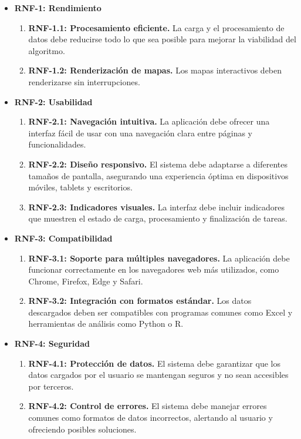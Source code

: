 \begin{itemize}

    \item \textbf{RNF-1: Rendimiento}
    \begin{enumerate}
        \item \textbf{RNF-1.1: Procesamiento eficiente.}  
        La carga y el procesamiento de datos debe reducirse todo lo que sea posible para mejorar la viabilidad del algoritmo.
        \item \textbf{RNF-1.2: Renderización de mapas.}  
        Los mapas interactivos deben renderizarse sin interrupciones.
    \end{enumerate}

    \item \textbf{RNF-2: Usabilidad}
    \begin{enumerate}
        \item \textbf{RNF-2.1: Navegación intuitiva.}  
        La aplicación debe ofrecer una interfaz fácil de usar con una navegación clara entre páginas y funcionalidades.
        \item \textbf{RNF-2.2: Diseño responsivo.}  
        El sistema debe adaptarse a diferentes tamaños de pantalla, asegurando una experiencia óptima en dispositivos móviles, tablets y escritorios.
        \item \textbf{RNF-2.3: Indicadores visuales.}  
        La interfaz debe incluir indicadores que muestren el estado de carga, procesamiento y finalización de tareas.
    \end{enumerate}

    \item \textbf{RNF-3: Compatibilidad}
    \begin{enumerate}
        \item \textbf{RNF-3.1: Soporte para múltiples navegadores.}  
        La aplicación debe funcionar correctamente en los navegadores web más utilizados, como Chrome, Firefox, Edge y Safari.
        \item \textbf{RNF-3.2: Integración con formatos estándar.}  
        Los datos descargados deben ser compatibles con programas comunes como Excel y herramientas de análisis como Python o R.
    \end{enumerate}

    \item \textbf{RNF-4: Seguridad}
    \begin{enumerate}
        \item \textbf{RNF-4.1: Protección de datos.}  
        El sistema debe garantizar que los datos cargados por el usuario se mantengan seguros y no sean accesibles por terceros.
        \item \textbf{RNF-4.2: Control de errores.}  
        El sistema debe manejar errores comunes como formatos de datos incorrectos, alertando al usuario y ofreciendo posibles soluciones.
    \end{enumerate}
    

\end{itemize}
